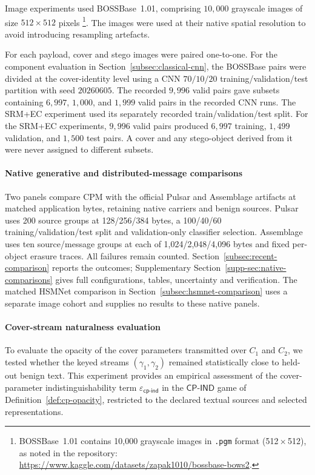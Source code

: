 \documentclass[pdflatex,sn-mathphys-num]{sn-jnl}%
\theoremstyle{definition}
\theoremstyle{game}
\theoremstyle{thmstyleone}%
\theoremstyle{thmstyletwo}%
\theoremstyle{thmstylethree}%
\begin{document}
Image experiments used BOSSBase~1.01, comprising $10{,}000$
grayscale images of size $512\times512$ pixels
\footnote{BOSSBase~1.01 contains 10{,}000 grayscale images in \texttt{.pgm} format (512\,$\times$\,512), as noted in the repository: \url{https://www.kaggle.com/datasets/zapak1010/bossbase-bows2}.}. The images were used at their native spatial
resolution to avoid introducing resampling artefacts. %

For each payload, cover and stego images were paired one-to-one.
For the component evaluation in Section~\ref{subsec:classical-cnn},
the BOSSBase pairs were divided at the cover-identity level using a
CNN $70/10/20$ training/validation/test partition with seed
$20260605$. The recorded $9{,}996$ valid pairs gave subsets containing $6{,}997$, $1{,}000$, and $1{,}999$ valid pairs in the recorded CNN runs. The SRM+EC experiment used its separately recorded train/validation/test split.
For the SRM+EC experiments, $9{,}996$ valid pairs produced
$6{,}997$ training, $1{,}499$ validation, and $1{,}500$ test pairs.
A cover and any stego-object derived from it were never assigned to
different subsets.

\paragraph{Native generative and distributed-message comparisons}
Two panels compare CPM with the official Pulsar and Assemblage artifacts
\cite{Jois2024Pulsar,Jois2026Assemblage} at matched application bytes,
retaining native carriers and benign sources. Pulsar uses 200 source
groups at 128/256/384 bytes, a 100/40/60 training/validation/test split
and validation-only classifier selection. Assemblage uses ten
source/message groups at each of 1,024/2,048/4,096 bytes and fixed
per-object erasure traces. All failures remain counted.
Section~\ref{subsec:recent-comparison} reports the outcomes;
Supplementary Section~\ref{supp-sec:native-comparisons} gives full
configurations, tables, uncertainty and verification. The matched
HSMNet comparison in Section~\ref{subsec:hsmnet-comparison} uses a separate
image cohort and supplies no results to these native panels.

\paragraph{Cover-stream naturalness evaluation}
To evaluate the opacity of the cover parameters transmitted over
$C_1$ and $C_2$, we tested whether the keyed streams
$(\gamma_1,\gamma_2)$ remained statistically close to held-out
benign text. This experiment provides an empirical assessment of the
cover-parameter indistinguishability term
$\varepsilon_{\mathsf{cp\text{-}ind}}$ in the
$\textsf{CP-IND}$ game of Definition~\ref{def:cp-opacity}, restricted to the declared
textual sources and selected representations.
\end{document}
